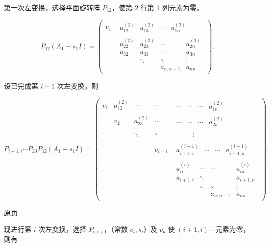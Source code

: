 \documentclass[
  10pt,
  fontset=fandol]{ctexart}
\begin{document}
第一次左变换，选择平面旋转阵 \(P_{12}\)，使第 2 行第 1 列元素为零。

\[
P_{12}(A_1-s_1I)=\begin{pmatrix}
v_1&\begin{matrix}a_{12}^{(2)}&a_{13}^{(2)}&\cdots&a_{1n}^{(2)}\end{matrix}\\
&\boxed{\begin{matrix}
a_{22}^{(2)}&a_{23}^{(2)}&\cdots&a_{2n}^{(2)}\\
a_{32}&a_{33}&\cdots&a_{3n}\\
&\ddots&\ddots&\vdots\\
&&a_{n,n-1}&a_{nn}
\end{matrix}}
\end{pmatrix}.
\]

设已完成第 \(i-1\) 次左变换，则

\[
P_{i-1,i}\cdots P_{23}P_{12}(A_1-s_1I)
=\begin{pmatrix}
v_1&a_{12}^{(2)}&\cdots&\cdots&\begin{matrix}\cdots&\cdots&\cdots&a_{1n}^{(2)}\end{matrix}\\
&v_2&a_{23}^{(2)}&\cdots&\begin{matrix}\cdots&\cdots&\cdots&a_{2n}^{(2)}\end{matrix}\\
&&\ddots&\ddots&\begin{matrix}&&&\vdots\end{matrix}\\
&&&v_{i-1}&\begin{matrix}a_{i-1,i}^{(i-1)}&\cdots&\cdots&a_{i-1,n}^{(i-1)}\end{matrix}\\
&&&&\boxed{\begin{matrix}
a_{ii}^{(i)}&\cdots&\cdots&a_{in}^{(i)}\\
a_{i+1,i}&\ddots&&a_{i+1,n}\\
&\ddots&\ddots&\vdots\\
&&a_{n,n-1}&a_{nn}
\end{matrix}}
\end{pmatrix}.
\]

\href{../../source-images/pdf-257.jpeg}{原页}

现进行第 \(i\) 次左变换，选择 \(P_{i,i+1}\)（常数 \(c_i,s_i\)）及 \(v_k\) 使 \((i+1,i)\)---元素为零，则有
\end{document}
